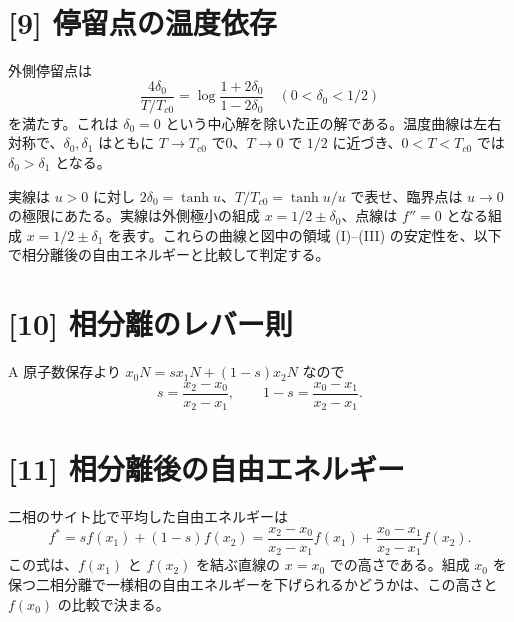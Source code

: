 \documentclass[11pt,a4paper]{article}
\begin{document}
\section*{[9] 停留点の温度依存}
外側停留点は
\[
\frac{4\delta_0}{T/T_{c0}}=
\log\frac{1+2\delta_0}{1-2\delta_0}
\quad(0<\delta_0<1/2)
\]
を満たす。これは $\delta_0=0$ という中心解を除いた正の解である。温度曲線は左右対称で、$\delta_0,\delta_1$ はともに $T\to T_{c0}$ で0、$T\to0$ で $1/2$ に近づき、$0<T<T_{c0}$ では $\delta_0>\delta_1$ となる。
\begin{center}
\end{center}
実線は $u>0$ に対し $2\delta_0=\tanh u$、$T/T_{c0}=\tanh u/u$ で表せ、臨界点は $u\to0$ の極限にあたる。実線は外側極小の組成 $x=1/2\pm\delta_0$、点線は $f''=0$ となる組成 $x=1/2\pm\delta_1$ を表す。これらの曲線と図中の領域 (I)–(III) の安定性を、以下で相分離後の自由エネルギーと比較して判定する。

\section*{[10] 相分離のレバー則}
A 原子数保存より $x_0N=sx_1N+(1-s)x_2N$ なので
\[
\boxed{s=\frac{x_2-x_0}{x_2-x_1}},\qquad 1-s=\frac{x_0-x_1}{x_2-x_1}.
\]

\section*{[11] 相分離後の自由エネルギー}
二相のサイト比で平均した自由エネルギーは
\[
\boxed{f^*=sf(x_1)+(1-s)f(x_2)
=\frac{x_2-x_0}{x_2-x_1}f(x_1)+\frac{x_0-x_1}{x_2-x_1}f(x_2)}.
\]
この式は、$f(x_1)$ と $f(x_2)$ を結ぶ直線の $x=x_0$ での高さである。組成 $x_0$ を保つ二相分離で一様相の自由エネルギーを下げられるかどうかは、この高さと $f(x_0)$ の比較で決まる。
\end{document}
